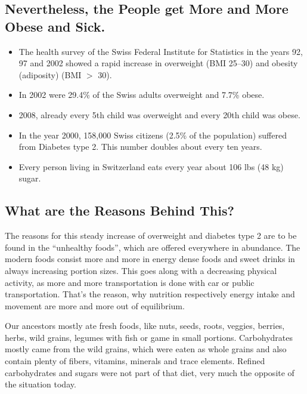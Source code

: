 \documentclass[../main.tex]{subfiles}
\begin{document}
  \subsection[Nevertheless, the People get More Obese and Sick]{Nevertheless, the People get More and More Obese and Sick.}

  \begin{itemize}
  \item The health survey of the Swiss Federal Institute for Statistics in the years 92, 97 and 2002
    showed a rapid increase in overweight (BMI 25--30) and obesity (adiposity) (BMI $>$ 30).
  \item In 2002 were 29.4\% of the Swiss adults overweight and 7.7\% obese.
  \item 2008, already every 5th child was overweight and every 20th child was obese.
  \item In the year 2000, 158,000 Swiss citizens (2.5\% of the population) suffered from Diabetes type 2. This number doubles about every ten years.
  \item Every person living in Switzerland eats every year about 106 lbs (48 kg) sugar.
  \end{itemize}

\subsection{What are the Reasons Behind This?}  

The reasons for this steady increase of overweight
and diabetes type 2
  are to be found in the ``unhealthy foods'',
which are offered everywhere in abundance.
The modern foods consist more and more in energy dense foods and sweet drinks in always increasing portion sizes.
This goes along with a decreasing physical activity, as more and more transportation is done with car or public transportation.
That's the reason, why nutrition respectively energy intake and movement are more and more out of equilibrium.

Our ancestors mostly ate fresh foods, like nuts, seeds, roots, veggies, berries, herbs, wild grains,
legumes with fish or game in small portions.
Carbohydrates mostly came from the wild grains, which were eaten as whole grains and also contain plenty
of fibers, vitamins, minerals and trace elements.
Refined carbohydrates and sugars were not part of that diet, very much the opposite of the situation today.
\end{document}
